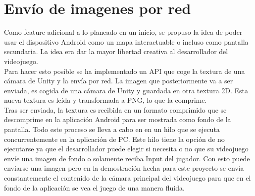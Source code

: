\section{Env\'io de imagenes por red}
\label{cap6:sec:discusion}

Como feature adicional a lo planeado en un inicio, se propuso la idea de poder usar el dispositivo Android como un mapa interactuable o incluso como pantalla secundaria. La idea era dar la mayor libertad creativa al desarrollador del videojuego.
\\
 Para hacer esto posible se ha implementado un API que coge la textura de una c\'amara de Unity y la env\'ia por red. La imagen que posteriormente va a ser enviada, es cogida de una c\'amara de Unity y guardada en otra textura 2D. Esta nueva textura es le\'ida y transformada a PNG, lo que la comprime.
\\
 Tras ser enviada, la textura es recibida en un formato comprimido que se descomprime en la aplicaci\'on Android para ser mostrada como fondo de la pantalla. Todo este proceso se lleva a cabo en en un hilo que se ejecuta concurrentemente en la aplicaci\'on de PC. Este hilo tiene la opci\'on de no ejecutarse ya que el desarrollador puede elegir si necesita o no que su videojuego env\'ie una imagen de fondo o solamente reciba Input del jugador. Con esto puede enviarse una imagen pero en la demostraci\'on hecha para este proyecto se env\'ia constantemente el contenido de la c\'amara principal del videojuego para que en el fondo de la aplicaci\'on se vea el juego de una manera fluida.

